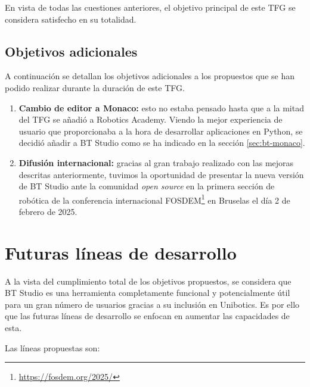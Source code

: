 En vista de todas las cuestiones anteriores, el objetivo principal de este TFG se considera satisfecho en su totalidad.

\subsection{Objetivos adicionales}

A continuación se detallan los objetivos adicionales a los propuestos que se han podido realizar durante la duración de este TFG.

\begin{enumerate}
    \item \textbf{Cambio de editor a Monaco:} esto no estaba pensado hasta que a la mitad del TFG se añadió a Robotics Academy. Viendo la mejor experiencia de usuario que proporcionaba a la hora de desarrollar aplicaciones en Python, se decidió añadir a BT Studio como se ha indicado en la sección \ref{sec:bt-monaco}.
    \item \textbf{Difusión internacional:} gracias al gran trabajo realizado con las mejoras descritas anteriormente, tuvimos la oportunidad de presentar la nueva versión de BT Studio ante la comunidad \textit{open source} en la primera sección de robótica de la conferencia internacional FOSDEM\footnote{\url{https://fosdem.org/2025/}} en Bruselas el día 2 de febrero de 2025.
\end{enumerate}

\section{Futuras líneas de desarrollo}

A la vista del cumplimiento total de los objetivos propuestos, se considera que BT Studio es una herramienta completamente funcional y potencialmente útil para un gran número de usuarios gracias a su inclusión en Unibotics. Es por ello que las futuras líneas de desarrollo se enfocan en aumentar las capacidades de esta.

Las líneas propuestas son:

